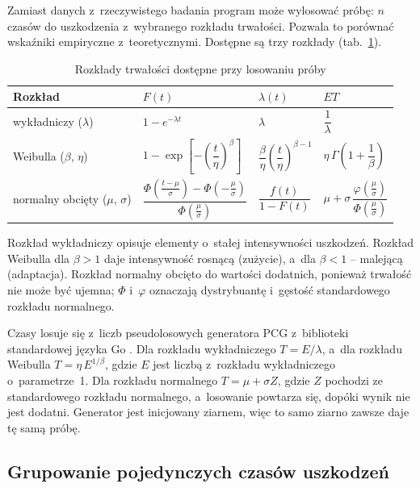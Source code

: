 Zamiast danych z~rzeczywistego badania program może wylosować próbę: $n$ czasów do
uszkodzenia z~wybranego rozkładu trwałości. Pozwala to porównać wskaźniki
empiryczne z~teoretycznymi. Dostępne są trzy rozkłady (tab.~\ref{tab:distributions}).

\begin{table}[H]
  \centering
  \caption{Rozkłady trwałości dostępne przy losowaniu próby}
  \label{tab:distributions}
  \small
  \renewcommand{\arraystretch}{1.7}
  \begin{tabular}{@{}llll@{}}
    \toprule
    Rozkład & $F(t)$ & $\lambda(t)$ & $ET$ \\
    \midrule
    wykładniczy ($\lambda$)
      & $1 - e^{-\lambda t}$
      & $\lambda$
      & $\dfrac{1}{\lambda}$ \\
    Weibulla ($\beta$, $\eta$)
      & $1 - \exp\!\left[-\left(\dfrac{t}{\eta}\right)^{\beta}\right]$
      & $\dfrac{\beta}{\eta}\left(\dfrac{t}{\eta}\right)^{\beta-1}$
      & $\eta\,\Gamma\!\left(1 + \dfrac{1}{\beta}\right)$ \\
    normalny obcięty ($\mu$, $\sigma$)
      & $\dfrac{\Phi\!\left(\frac{t-\mu}{\sigma}\right) - \Phi\!\left(-\frac{\mu}{\sigma}\right)}{\Phi\!\left(\frac{\mu}{\sigma}\right)}$
      & $\dfrac{f(t)}{1 - F(t)}$
      & $\mu + \sigma\,\dfrac{\varphi\!\left(\frac{\mu}{\sigma}\right)}{\Phi\!\left(\frac{\mu}{\sigma}\right)}$ \\
    \bottomrule
  \end{tabular}
\end{table}

Rozkład wykładniczy opisuje elementy o~stałej intensywności uszkodzeń. Rozkład
Weibulla dla $\beta > 1$ daje intensywność rosnącą (zużycie), a~dla $\beta < 1$ --
malejącą (adaptacja). Rozkład normalny obcięto do wartości dodatnich, ponieważ
trwałość nie może być ujemna; $\Phi$ i~$\varphi$ oznaczają dystrybuantę i~gęstość
standardowego rozkładu normalnego.

Czasy losuje się z~liczb pseudolosowych generatora PCG z~biblioteki standardowej
języka Go \cite{go}. Dla rozkładu wykładniczego $T = E/\lambda$, a~dla rozkładu
Weibulla $T = \eta\,E^{1/\beta}$, gdzie $E$ jest liczbą z~rozkładu wykładniczego
o~parametrze~1. Dla rozkładu normalnego $T = \mu + \sigma Z$, gdzie $Z$ pochodzi ze
standardowego rozkładu normalnego, a~losowanie powtarza się, dopóki wynik nie jest
dodatni. Generator jest inicjowany ziarnem, więc to samo ziarno zawsze daje tę samą
próbę.

\subsection{Grupowanie pojedynczych czasów uszkodzeń}
\label{sec:grouping}

